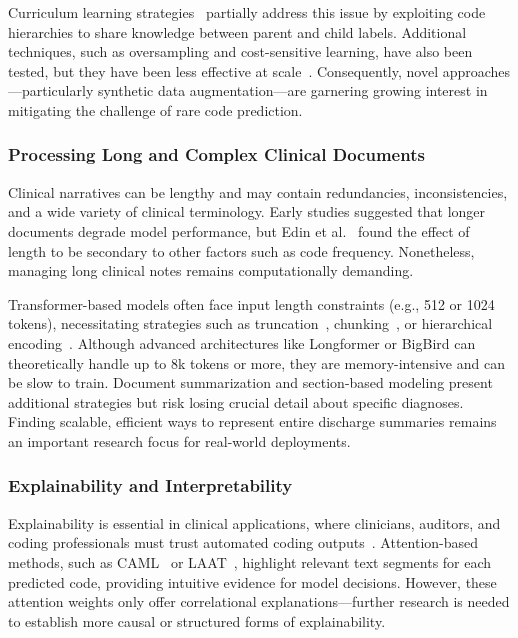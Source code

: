 Curriculum learning strategies~\citep{ren2022hicu} partially address this issue by exploiting code hierarchies to share knowledge between parent and child labels. Additional techniques, such as oversampling and cost-sensitive learning, have also been tested, but they have been less effective at scale~\citep{scheurwegs2017data}. Consequently, novel approaches---particularly synthetic data augmentation---are garnering growing interest in mitigating the challenge of rare code prediction.

\subsubsection{Processing Long and Complex Clinical Documents}

Clinical narratives can be lengthy and may contain redundancies, inconsistencies, and a wide variety of clinical terminology. Early studies suggested that longer documents degrade model performance, but Edin et al.~\citep{edin2023automated} found the effect of length to be secondary to other factors such as code frequency. Nonetheless, managing long clinical notes remains computationally demanding.

Transformer-based models often face input length constraints (e.g., 512 or 1024 tokens), necessitating strategies such as truncation~\citep{gao2021limitations}, chunking~\citep{huang2022plm}, or hierarchical encoding~\citep{heo2022medical}. Although advanced architectures like Longformer or BigBird can theoretically handle up to 8k tokens or more, they are memory-intensive and can be slow to train. Document summarization and section-based modeling present additional strategies but risk losing crucial detail about specific diagnoses. Finding scalable, efficient ways to represent entire discharge summaries remains an important research focus for real-world deployments.

\subsubsection{Explainability and Interpretability}

Explainability is essential in clinical applications, where clinicians, auditors, and coding professionals must trust automated coding outputs~\citep{holzinger2017we}. Attention-based methods, such as CAML~\citep{mullenbach2018explainable} or LAAT~\citep{vu2020label}, highlight relevant text segments for each predicted code, providing intuitive evidence for model decisions. However, these attention weights only offer correlational explanations---further research is needed to establish more causal or structured forms of explainability.

